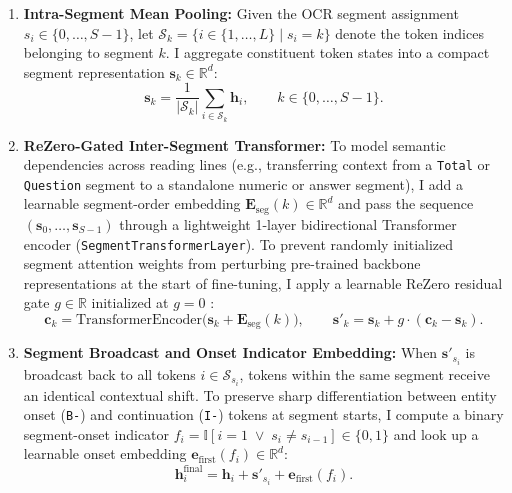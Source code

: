 \begin{enumerate}
    \item \textbf{Intra-Segment Mean Pooling:}
    Given the OCR segment assignment $s_i \in \{0, \dots, S-1\}$, let $\mathcal{S}_k = \{i \in \{1, \dots, L\} \mid s_i = k\}$ denote the token indices belonging to segment $k$. I aggregate constituent token states into a compact segment representation $\mathbf{s}_k \in \mathbb{R}^d$:
    \begin{equation}
        \mathbf{s}_k = \frac{1}{|\mathcal{S}_k|} \sum_{i \in \mathcal{S}_k} \mathbf{h}_i, \qquad k \in \{0, \dots, S-1\}.
        \label{eq:segment_mean_pool}
    \end{equation}

    \item \textbf{ReZero-Gated Inter-Segment Transformer:}
    To model semantic dependencies across reading lines (e.g., transferring context from a \texttt{Total} or \texttt{Question} segment to a standalone numeric or answer segment), I add a learnable segment-order embedding $\mathbf{E}_{\text{seg}}(k) \in \mathbb{R}^d$ and pass the sequence $(\mathbf{s}_0, \dots, \mathbf{s}_{S-1})$ through a lightweight 1-layer bidirectional Transformer encoder (\texttt{SegmentTransformerLayer}). To prevent randomly initialized segment attention weights from perturbing pre-trained backbone representations at the start of fine-tuning, I apply a learnable ReZero residual gate $g \in \mathbb{R}$ initialized at $g = 0$ \cite{bachlechner2021rezero}:
    \begin{equation}
        \mathbf{c}_k = \text{TransformerEncoder}\big(\mathbf{s}_k + \mathbf{E}_{\text{seg}}(k)\big), \qquad
        \mathbf{s}'_k = \mathbf{s}_k + g \cdot (\mathbf{c}_k - \mathbf{s}_k).
        \label{eq:rezero_segment}
    \end{equation}

    \item \textbf{Segment Broadcast and Onset Indicator Embedding:}
    When $\mathbf{s}'_{s_i}$ is broadcast back to all tokens $i \in \mathcal{S}_{s_i}$, tokens within the same segment receive an identical contextual shift. To preserve sharp differentiation between entity onset (\texttt{B-}) and continuation (\texttt{I-}) tokens at segment starts, I compute a binary segment-onset indicator $f_i = \mathbb{I}[i = 1 \;\vee\; s_i \neq s_{i-1}] \in \{0, 1\}$ and look up a learnable onset embedding $\mathbf{e}_{\text{first}}(f_i) \in \mathbb{R}^d$:
    \begin{equation}
        \mathbf{h}_i^{\text{final}} = \mathbf{h}_i + \mathbf{s}'_{s_i} + \mathbf{e}_{\text{first}}(f_i).
        \label{eq:final_token_repr}
    \end{equation}
\end{enumerate}

